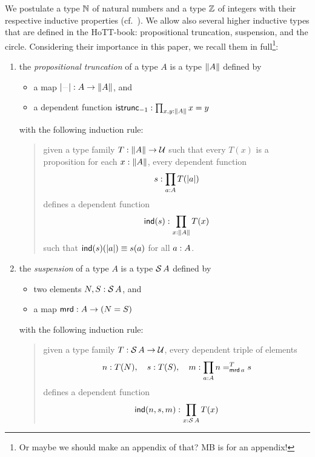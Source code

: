 \documentclass[english,a4]{article}
\begin{document}
We postulate a type $\mathbb{N}$ of natural numbers and a type $\mathbb{Z}$ of
integers with their respective inductive properties
(cf.~\cite[Ch.??]{HoTT}). We allow also several higher inductive types
that are defined in the HoTT-book: propositional truncation,
suspension, and the circle. Considering their importance in this
paper, we recall them in full\footnote{\color{red}Or maybe we should
  make an appendix of that? MB is for an appendix!}:
\begin{enumerate}
\item the {\em propositional truncation} of a type $A$ is a type
  $\lVert A\rVert$ defined by
  \begin{itemize}
  \item a map $\trunc \blank \from A \to \Trunc A$, and
  \item a dependent function
    $\mathsf{istrunc}_{-1} : \prod_{x,y: \lVert A\rVert} x=y$
  \end{itemize}
  with the following induction rule:
  \begin{quote}
    given a type family $T: \lVert A\rVert \to \mathcal{U}$ such that every
    $T(x)$ is a proposition for each $x: \lVert A\rVert$, every
    dependent function
    \begin{displaymath}
      s: \prod_{a: A}T(\lvert a\rvert)
    \end{displaymath}
    defines a dependent function
    \begin{displaymath}
      \operatorname{\mathsf{ind}}(s):\prod_{x: \lVert A\rVert} T(x)
    \end{displaymath}
    such that $\operatorname{\mathsf{ind}}(s)(\lvert a\rvert) \equiv s(a)$ for all $a: A$.
  \end{quote}
\item the {\em suspension} of a type $A$ is a type $\operatorname{\mathcal S} A$ defined
  by
  \begin{itemize}
  \item two elements $N,S: \operatorname{\mathcal S} A$, and
  \item a  map $\operatorname{\mathsf{mrd}} : A \to (N=S)$
  \end{itemize}
  with the following induction rule:
  \begin{quote}
    given a type family $T: \operatorname{\mathcal S} A \to \mathcal{U}$, every dependent
    triple of elements
    \begin{displaymath}
      n: T(N), \quad s: T(S),\quad
      m: \prod_{a: A}n =^{T}_{\operatorname{\mathsf{mrd}} a} s
    \end{displaymath}
    defines a dependent function
    \begin{displaymath}
      \ind(n,s,m)\from\prod_{x\from \susp A} T(x)

\end{displaymath}
\end{quote}
\end{enumerate}
\end{document}
